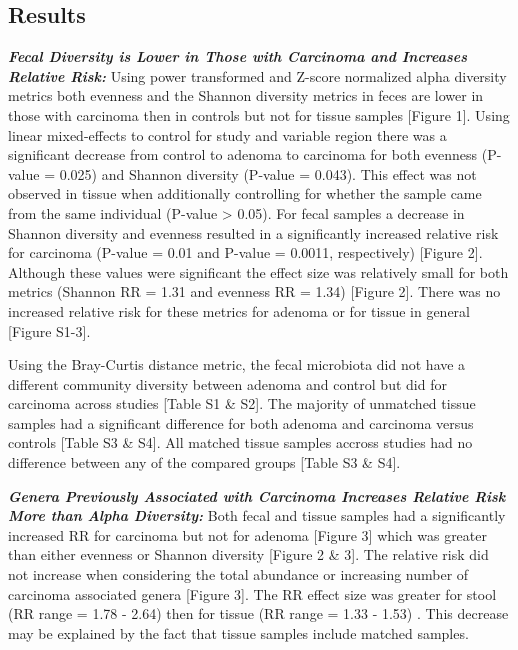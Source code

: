 \documentclass[12pt,]{article}
\begin{document}
\newpage

\subsection{Results}\label{results}

\textbf{\emph{Fecal Diversity is Lower in Those with Carcinoma and
Increases Relative Risk:}} Using power transformed and Z-score
normalized alpha diversity metrics both evenness and the Shannon
diversity metrics in feces are lower in those with carcinoma then in
controls but not for tissue samples {[}Figure 1{]}. Using linear
mixed-effects to control for study and variable region there was a
significant decrease from control to adenoma to carcinoma for both
evenness (P-value = 0.025) and Shannon diversity (P-value = 0.043). This
effect was not observed in tissue when additionally controlling for
whether the sample came from the same individual (P-value \textgreater{}
0.05). For fecal samples a decrease in Shannon diversity and evenness
resulted in a significantly increased relative risk for carcinoma
(P-value = 0.01 and P-value = 0.0011, respectively) {[}Figure 2{]}.
Although these values were significant the effect size was relatively
small for both metrics (Shannon RR = 1.31 and evenness RR = 1.34)
{[}Figure 2{]}. There was no increased relative risk for these metrics
for adenoma or for tissue in general {[}Figure S1-3{]}.

Using the Bray-Curtis distance metric, the fecal microbiota did not have
a different community diversity between adenoma and control but did for
carcinoma across studies {[}Table S1 \& S2{]}. The majority of unmatched
tissue samples had a significant difference for both adenoma and
carcinoma versus controls {[}Table S3 \& S4{]}. All matched tissue
samples accross studies had no difference between any of the compared
groups {[}Table S3 \& S4{]}.

\textbf{\emph{Genera Previously Associated with Carcinoma Increases
Relative Risk More than Alpha Diversity:}} Both fecal and tissue samples
had a significantly increased RR for carcinoma but not for adenoma
{[}Figure 3{]} which was greater than either evenness or Shannon
diversity {[}Figure 2 \& 3{]}. The relative risk did not increase when
considering the total abundance or increasing number of carcinoma
associated genera {[}Figure 3{]}. The RR effect size was greater for
stool (RR range = 1.78 - 2.64) then for tissue (RR range = 1.33 - 1.53)
. This decrease may be explained by the fact that tissue samples include
matched samples.
\end{document}
